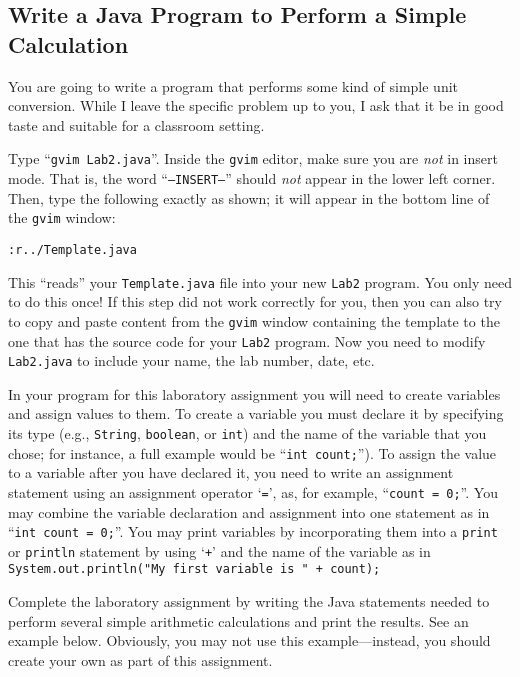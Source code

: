 \vspace*{-.1in}
\subsection*{Write a Java Program to Perform a Simple Calculation}

You are going to write a program that performs some kind of simple unit conversion. While I leave the specific problem
up to you, I ask that it be in good taste and suitable for a classroom setting.

 Type ``{\tt gvim Lab2.java}''. Inside the {\tt gvim} editor, make sure you are {\em
not} in insert mode. That is, the word ``{\tt --INSERT--}'' should {\em not} appear in the lower left corner. Then, type
the following exactly as shown; it will appear in the bottom line of the {\tt gvim} window:

\begin{center} \verb$:r../Template.java$ \end{center}

This ``reads'' your {\tt Template.java} file into your new {\tt Lab2} program.  You only need to do this once!  If this
step did not work correctly for you, then you can also try to copy and paste content from the {\tt gvim} window
containing the template to the one that has the source code for your {\tt Lab2} program. Now you need to modify {\tt
Lab2.java} to include your name, the lab number, date, etc.

In your program for this laboratory assignment you will need to create variables and assign values to them. To create a
variable you must declare it by specifying its type (e.g., {\tt String}, {\tt boolean}, or {\tt int}) and the name of
the variable that you chose; for instance, a full example would be ``{\tt int count;}'').  To assign the value to a
variable after you have declared it, you need to write an assignment statement using an assignment operator `{\tt =}',
as, for example, ``{\tt count = 0;}''. You may combine the variable declaration and assignment into one statement as in
``{\tt int count = 0;}''. You may print variables by incorporating them into a {\tt print} or {\tt println} statement by
using `{\tt +}' and the name of the variable as in {\tt System.out.println("My first variable is " + count);}

 Complete the laboratory assignment by writing the Java statements needed to perform several simple arithmetic
 calculations and print the results. See an example below. Obviously, you may not use this example---instead, you should
 create your own as part of this assignment.

